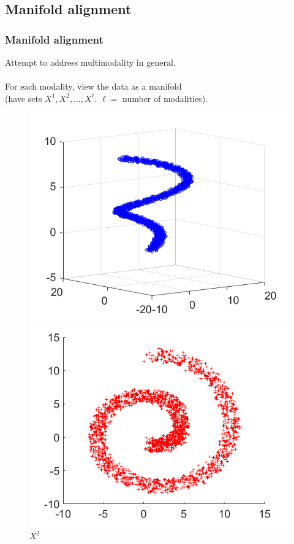 \documentclass{beamer}
\begin{document}
\subsection{Manifold alignment}
\begin{frame}
  \frametitle{Manifold alignment}
  Attempt to address multimodality in general.\\~\\
  For each modality, view the data as a manifold \\
  (have sets $X^1,X^2,\ldots,X^\ell$. $\ell = $ number of modalities).
  \begin{figure}
    \hfill
    \begin{minipage}[b]{0.40\linewidth}
      \centering
      \includegraphics[width=\textwidth]{./Images/KEMA_Example/X1.png}
      \caption{$X^1$}
    \end{minipage}
    \hfill
    \begin{minipage}[b]{0.40\linewidth}
      \centering
      \includegraphics[width=\textwidth]{./Images/KEMA_Example/X2.png}
      \caption{$X^2$}
    \end{minipage}
    \hfill
  \end{figure}
\end{frame}
\end{document}
